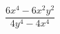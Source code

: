\begin{ex}[type=expression]
	\begin{condition}
		\(\dfrac{6x^4-6x^2y^2}{4y^4-4x^4}\)
	\end{condition}
\end{ex}